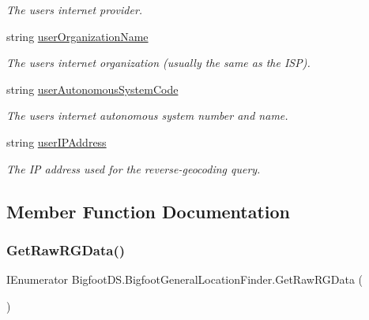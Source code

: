 \begin{DoxyCompactItemize}
\begin{DoxyCompactList}\small\item\em The user\textquotesingle{}s internet provider. \end{DoxyCompactList}\item 
string \mbox{\hyperlink{class_bigfoot_d_s_1_1_bigfoot_general_location_finder_a410dad417fd2d229d2caf1474107364c}{user\+Organization\+Name}}
\begin{DoxyCompactList}\small\item\em The user\textquotesingle{}s internet organization (usually the same as the I\+SP). \end{DoxyCompactList}\item 
string \mbox{\hyperlink{class_bigfoot_d_s_1_1_bigfoot_general_location_finder_a973995199b617a6d6b40c4c7a331f5de}{user\+Autonomous\+System\+Code}}
\begin{DoxyCompactList}\small\item\em The user\textquotesingle{}s internet autonomous system number and name. \end{DoxyCompactList}\item 
string \mbox{\hyperlink{class_bigfoot_d_s_1_1_bigfoot_general_location_finder_ab1b2e2503b22529b0936c9c9ba8b88e0}{user\+I\+P\+Address}}
\begin{DoxyCompactList}\small\item\em The IP address used for the reverse-\/geocoding query. \end{DoxyCompactList}\end{DoxyCompactItemize}


\subsection{Member Function Documentation}
\mbox{\label{class_bigfoot_d_s_1_1_bigfoot_general_location_finder_a6fbed1e746517af8589df774e582771e}} 
\subsubsection{\texorpdfstring{Get\+Raw\+R\+G\+Data()}{GetRawRGData()}}
{\footnotesize\ttfamily I\+Enumerator Bigfoot\+D\+S.\+Bigfoot\+General\+Location\+Finder.\+Get\+Raw\+R\+G\+Data (\begin{DoxyParamCaption}{ }\end{DoxyParamCaption})}



